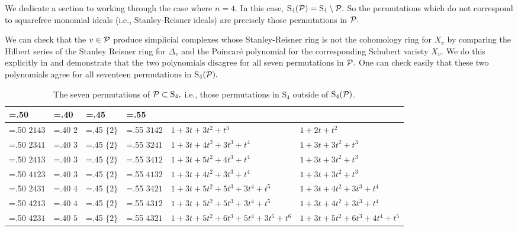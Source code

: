 We dedicate a section to working through the case where $n=4.$
In this case, $\mathrm{S}_4(\mathcal{P}) = \mathrm{S}_4\setminus\mathcal{P}.$ So the permutations which do not correspond to squarefree monomial ideals (i.e., Stanley-Reisner ideals) are precisely those permutations in $\mathcal{P}.$ 

 
We can check that the $v\in\mathcal{P}$ produce simplicial complexes whose Stanley-Reisner ring is not the cohomology ring for $X_v$ by comparing the Hilbert series of the Stanley Reisner ring for $\Delta_v $ and the Poincar\'e polynomial for the corresponding Schubert variety $X_v.$ We do this explicitly in  and demonstrate that the two polynomials disagree for all seven permutations in $\mathcal{P}.$ One can check easily that these two polynomials agree for all seventeen permutations in $\mathrm{S}_4(\mathcal{P}).$


\begin{table}[htbp]
\centering
\small
\renewcommand{\arraystretch}{1.8}
\begin{tabularx}{\textwidth}{
|>{\hsize=.50\hsize\centering\arraybackslash}X
|>{\hsize=.40\hsize\centering\arraybackslash}X
|>{\hsize=.45\hsize\centering\arraybackslash}X
|>{\hsize=.55\hsize\centering\arraybackslash}X
|>{\hsize=2.10\hsize\centering\arraybackslash}X
|>{\hsize=2.00\hsize\centering\arraybackslash}X
|}
\hline
\rowcolor{light-blue}
\raisebox{0.4em}{{\large $v$}}
& \raisebox{0.4em}{{\large $\ell(v)$}}
& \raisebox{0.4em}{{\large $A(v)$}}
& \raisebox{0.4em}{{\large $s_2v$}}
& \raisebox{0.4em}{{\large $\mathrm{Hilb}(R_{\Delta,n},t)$}}
& \raisebox{0.4em}{{\large $\mathrm{Poin}_{X_v}=\sum_{\omega\le v}t^{\ell(\omega)}$}}\rule{0pt}{2.2em}
\\
\hline
\rowcolor{grayish}
$2143$ & $2$ & $\{2\}$ & $3142$
& $1+3t+3t^2+t^3$
& $1+2t+t^2$ \\
\rowcolor{light-grayish}
$2341$ & $3$ & $\{2\}$ & $3241$
& $1+3t+4t^2+3t^3+t^4$
& $1+3t+3t^2+t^3$ \\
\rowcolor{grayish}
$2413$ & $3$ & $\{2\}$ & $3412$
& $1+3t+5t^2+4t^3+t^4$
& $1+3t+3t^2+t^3$ \\
\rowcolor{light-grayish}
$4123$ & $3$ & $\{2\}$ & $4132$
& $1+3t+4t^2+3t^3+t^4$
& $1+3t+3t^2+t^3$ \\
\rowcolor{grayish}
$2431$ & $4$ & $\{2\}$ & $3421$
& $1+3t+5t^2+5t^3+3t^4+t^5$
& $1+3t+4t^2+3t^3+t^4$ \\
\rowcolor{light-grayish}
$4213$ & $4$ & $\{2\}$ & $4312$
& $1+3t+5t^2+5t^3+3t^4+t^5$
& $1+3t+4t^2+3t^3+t^4$ \\
\rowcolor{grayish}
$4231$ & $5$ & $\{2\}$ & $4321$
& $1+3t+5t^2+6t^3+5t^4+3t^5+t^6$
& $1+3t+5t^2+6t^3+4t^4+t^5$ \\
\hline
\end{tabularx}
\caption{The seven permutations of $\mathcal{P}\subset\mathrm{S}_4,$ i.e., those permutations in $\mathrm{S}_4$ outside of $\mathrm{S}_4(\mathcal{P})$.}
\label{tab:S4-bad-permutations}
\end{table}

